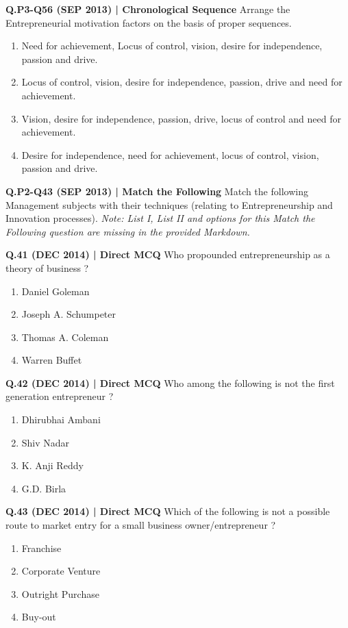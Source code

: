\documentclass{article}
\begin{document}
\textbf{Q.P3-Q56 (SEP 2013) | Chronological Sequence}
Arrange the Entrepreneurial motivation factors on the basis of proper sequences.
\begin{enumerate}[label=(\arabic*)]
    \item Need for achievement, Locus of control, vision, desire for independence, passion and drive.
    \item Locus of control, vision, desire for independence, passion, drive and need for achievement.
    \item Vision, desire for independence, passion, drive, locus of control and need for achievement.
    \item Desire for independence, need for achievement, locus of control, vision, passion and drive.
\end{enumerate}

\textbf{Q.P2-Q43 (SEP 2013) | Match the Following}
Match the following Management subjects with their techniques (relating to Entrepreneurship and Innovation processes).
\emph{Note: List I, List II and options for this Match the Following question are missing in the provided Markdown.}

\textbf{Q.41 (DEC 2014) | Direct MCQ}
Who propounded entrepreneurship as a theory of business ?
\begin{enumerate}[label=(\arabic*)]
    \item Daniel Goleman
    \item Joseph A. Schumpeter
    \item Thomas A. Coleman
    \item Warren Buffet
\end{enumerate}

\textbf{Q.42 (DEC 2014) | Direct MCQ}
Who among the following is not the first generation entrepreneur ?
\begin{enumerate}[label=(\arabic*)]
    \item Dhirubhai Ambani
    \item Shiv Nadar
    \item K. Anji Reddy
    \item G.D. Birla
\end{enumerate}

\textbf{Q.43 (DEC 2014) | Direct MCQ}
Which of the following is not a possible route to market entry for a small business owner/entrepreneur ?
\begin{enumerate}[label=(\arabic*)]
    \item Franchise
    \item Corporate Venture
    \item Outright Purchase
    \item Buy-out
\end{enumerate}
\end{document}

